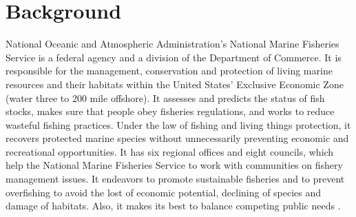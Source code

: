 \documentclass[12pt,letterpaper]{article}
\theoremstyle{definition}
\begin{document}
\section{Background} 
National Oceanic and Atmospheric Administration's National Marine Fisheries Service is a federal agency and a division of the Department of Commerce. It is responsible for the management, conservation and protection of living marine resources and their habitats within the United States' Exclusive Economic Zone (water three to 200 mile offshore). It assesses and predicts the status of fish stocks, makes sure that people obey fisheries regulations, and works to reduce wasteful fishing practices. Under the law of fishing and living things protection, it recovers protected marine species without unnecessarily preventing economic and recreational opportunities. It has six regional offices and eight councils, which help the National Marine Fisheries Service to work with communities on fishery management issues. It endeavors to promote sustainable fisheries and to prevent overfishing to avoid the lost of economic potential, declining of species and damage of habitats. Also, it makes its best to balance competing public needs \cite{NOAA}.
\end{document}
